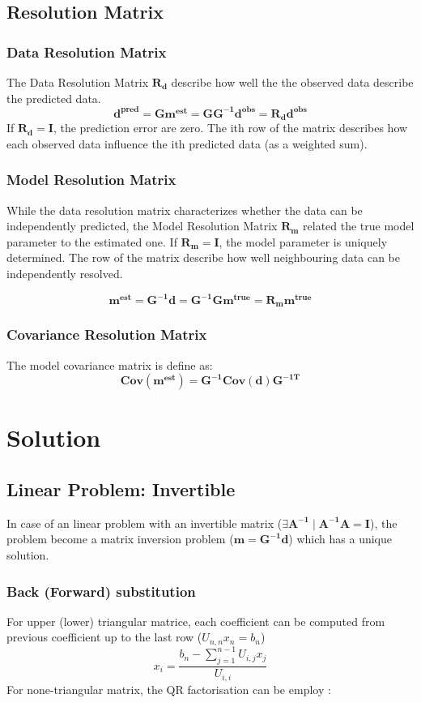 \documentclass[twocolumn]{article}
\numberwithin{equation}{section}
\begin{document}
	\subsection{Resolution Matrix}
		\subsubsection{Data Resolution Matrix}
The Data Resolution Matrix $\mathbf{R_d}$ describe how well the the observed data describe the predicted data. 
$$\mathbf{d^{pred}=Gm^{est}=GG^{-1}d^{obs}=R_d d^{obs}}$$
If $\mathbf{R_d=I}$, the prediction error are zero. The ith row of the matrix describes how each observed data influence the ith predicted data (as a weighted sum). 

		\subsubsection{Model Resolution Matrix}
While the data resolution matrix characterizes whether the data can be independently predicted, the Model Resolution Matrix $\mathbf{R_m}$ related the true model parameter to the estimated one. If  $\mathbf{R_m=I}$, the model parameter is uniquely determined. The row of the matrix describe how well neighbouring data can be independently resolved.

$$\mathbf{m^{est}=G^{-1}d=G^{-1}Gm^{true}=R_m m^{true}}$$



		\subsubsection{Covariance Resolution Matrix}
The model covariance matrix is define as:
$$\mathbf{\text{Cov}(m^{est}) = G^{-1}\text{Cov}(d) G^{-1T}}$$


\newpage
\section{Solution}




	\subsection{Linear Problem: Invertible}
In case of an linear problem with an invertible matrix ($\exists \mathbf{A^{-1}} \mid  \mathbf{A^{-1}A=I}$), the problem become a matrix inversion problem ($\mathbf{m=G^{-1}d}$) which has a unique solution.


		\subsubsection{Back (Forward) substitution}
For upper (lower) triangular matrice, each coefficient can be computed from previous coefficient up to the last row ($U_{n,n}x_{n}=b_n$)
	$$x_i=\frac{b_n -\sum_{j=1}^{n-1} U_{i,j}x_j}{U_{i,i}}$$
For none-triangular matrix, the QR factorisation can be employ :
\end{document}
